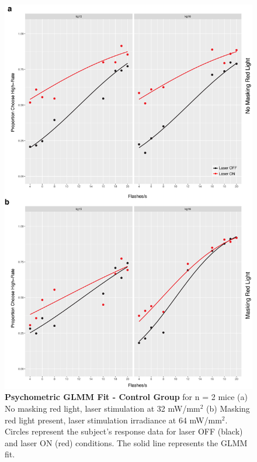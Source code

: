\begin{figure}
  \centering
   \includegraphics[width=\textwidth,height=0.8\textheight,keepaspectratio]{Figures/chapter4/GLMM_PMFS_controls.png}
  \caption[Psychometric GLMM Fit - Control Group]{\textbf{Psychometric GLMM Fit - Control Group} for n = 2 mice (a) No masking red light, laser stimulation at 32 mW/mm$^{2}$ (b) Masking red light present, laser stimulation irradiance at 64 mW/mm$^{2}$. Circles represent the subject's response data for laser OFF (black) and laser ON (red) conditions. The solid line represents the GLMM fit. }
   \label{fig:glmmcontrolpmfs}
\end{figure}

